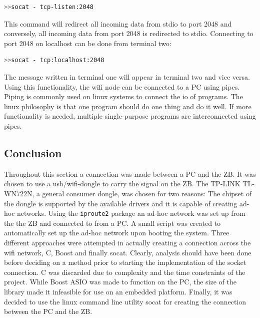 \begin{lstlisting}[language=bash]
>>socat - tcp-listen:2048
\end{lstlisting}

This command will redirect all incoming data from stdio to port 2048 and conversely, all incoming data from port 2048 is redirected to stdio. 
Connecting to port 2048 on localhost can be done from terminal two:

\begin{lstlisting}[language=bash]
>>socat - tcp:localhost:2048
\end{lstlisting}

The message written in terminal one will appear in terminal two and vice versa.
Using this functionality, the wifi node can be connected to a PC using pipes.
Piping is commonly used on linux systems to connect the io of programs.
The linux philosophy is that one program should do one thing and do it well.
If more functionality is needed, multiple single-purpose programs are interconnected using pipes.

\subsection{Conclusion}

Throughout this section a connection was made between a PC and the ZB.
It was chosen to use a usb/wifi-dongle to carry the signal on the ZB.
The TP-LINK TL-WN722N, a general consumer dongle, was chosen for two reasons: The chipset of the dongle is supported by the available drivers and it is capable of creating ad-hoc networks.
Using the \texttt{iproute2} package an ad-hoc network was set up from the the ZB and connected to from a PC.
A small script was created to automatically set up the ad-hoc network upon booting the system.
Three different approaches were attempted in actually creating a connection across the wifi network, C, Boost and finally socat.
Clearly, analysis should have been done before deciding on a method prior to starting the implementation of the socket connection.
C was discarded due to complexity and the time constraints of the project.
While Boost ASIO was made to function on the PC, the size of the library made it infeasible for use on an embedded platform.
Finally, it was decided to use the linux command line utility socat for creating the connection between the PC and the ZB.